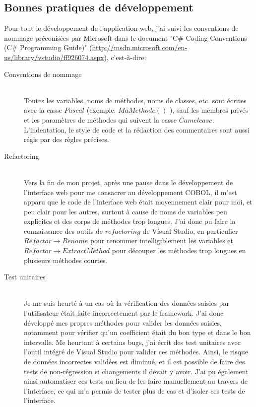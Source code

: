 \documentclass[a4paper,french,12pt]{article}
\begin{document}
	\subsection{Bonnes pratiques de développement}
			Pour tout le développement de l'application web, j'ai suivi les conventions de nommage préconisées par Microsoft dans le document
			"C\# Coding Conventions (C\# Programming Guide)" (\url{http://msdn.microsoft.com/en-us/library/vstudio/ff926074.aspx}), c'est-à-dire:
			\begin{description} 
				\item[Conventions de nommage] \hfill \\
					Toutes les variables, noms de méthodes, noms de classes, etc. sont écrites avec la casse $Pascal$ (exemple: $MaMethode()$ ), sauf les membres privés et les paramètres de méthodes qui suivent
					la casse $Camelcase$.
					L'indentation, le style de code et la rédaction des commentaires sont aussi régis par des règles précises.
				\item[Refactoring] \hfill \\
					Vers la fin de mon projet, après une pause dans le développement de l'interface web pour me consacrer au développement COBOL, il m'est apparu que le code de l'interface web était moyennement clair pour moi, 
					et peu clair pour les autres, surtout à cause de noms de variables peu explicites et des corps de méthodes trop longues.
					J'ai donc pu faire la connaissance des outils de $refactoring$ de Visual Studio, en particulier $Refactor \to Rename$ pour renommer intelligiblement les variables
					et $Refactor \to Extract Method$ pour découper les méthodes trop longues en plusieurs méthodes courtes.
				\item[Test unitaires]  \hfill \\
					Je me suis heurté à un cas où la vérification des données saisies par l'utilisateur était faite incorrectement par le framework. J'ai donc développé mes propres méthodes pour valider les données saisies,
					notamment pour vérifier qu'un coefficient était du bon type et dans le bon intervalle. Me heurtant à certains bugs, j'ai écrit des test unitaires avec l'outil intégré de Visual Studio 
					pour valider ces méthodes. Ainsi, le risque de données incorrectes validées est diminué, et il est possible de faire des tests de non-régression si changements il devait y avoir.
					J'ai pu également ainsi automatiser ces tests au lieu de les faire manuellement au travers de l'interface, ce qui m'a permis de tester plus de cas et d'isoler ces tests de l'interface.
			\end{description}
	
\end{document}
